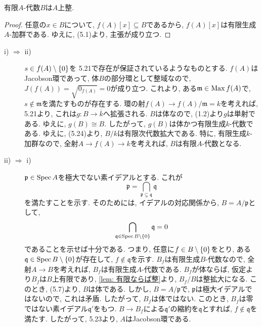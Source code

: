 \documentclass[dvipdfmx]{jsarticle}
\begin{document}
    \begin{lemma} \label{lem: 有限ならば整}
        有限$A$-代数$B$は$A$上整.
    \end{lemma}
    \begin{proof}
        任意の$x \in B$について, $f(A)[x] \subseteq B$であるから, $f(A)[x]$は有限生成$A$-加群である.
        ゆえに, (5.1)より, 主張が成り立つ.
    \end{proof}

    \begin{problem}
        \begin{description}
            \item[i) $\Rightarrow$ ii)]
            $s \in f(A) \setminus \{0\}$を
            5.21で存在が保証されているようなものとする.
            $f(A)$はJacobson環であって, 体$B$の部分環として整域なので,
            $J(f(A)) = \sqrt{0_{f(A)}} = 0$が成り立つ.
            これより, ある$\mathfrak{m} \in \operatorname{Max}{f(A)}$で, $s \notin \mathfrak{m}$を満たすものが存在する.
            環の射$f(A) \to f(A)/\mathfrak{m} = k$を考えれば, 5.21より, これは$g:B \to \overline{k}$へ拡張される.
            $B$は体なので, (1.2)より$g$は単射である.
            ゆえに, $g(B) \cong B$.
            したがって, $g(B)$は体かつ有限生成$k$-代数である.
            ゆえに, (5.24)より, $B/k$は有限次代数拡大である.
            特に, 有限生成$k$-加群なので,
            全射$A \to f(A) \to k$を考えれば, $B$は有限$A$-代数となる.
            \item[ii) $\Rightarrow$ i)]
            $\mathfrak{p} \in \operatorname{Spec}{A}$を極大でない素イデアルとする.
            これが
            \[
                \mathfrak{p} = \bigcap_{\mathfrak{p} \subsetneq \mathfrak{q}} \mathfrak{q}
            \]
            を満たすことを示す.
            そのためには, イデアルの対応関係から, $B = A/\mathfrak{p}$として,
            \[
                \bigcap_{\mathfrak{q} \in \operatorname{Spec}{B}\setminus\{0\}} \mathfrak{q} = 0
            \]
            であることを示せば十分である.
            つまり, 任意に$f \in B \setminus \{0\}$をとり, ある$\mathfrak{q} \in \operatorname{Spec}{B} \setminus \{0\}$が存在して, $f \notin \mathfrak{q}$を示す.
            $B_f$は有限生成$B$-代数なので, 全射$A \to B$を考えれば, $B_f$は有限生成$A$-代数である.
            $B_f$が体ならば, 仮定より$B_f$は$B$上有限であり, \cref{lem: 有限ならば整}より, $B_f/B$は整拡大になる.
            このとき, (5.7)より, $B$は体である.
            しかし, $B = A/\mathfrak{p}$で, $\mathfrak{p}$は極大イデアルではないので,
            これは矛盾.
            したがって, $B_f$は体ではない.
            このとき, $B_f$は零ではない素イデアル$\mathfrak{q}'$をもつ.
            $B \to B_f$による$\mathfrak{q}'$の縮約を$\mathfrak{q}$とすれば, $f \notin \mathfrak{q}$を満たす.
            したがって, 5.23より, $A$はJacobson環である.
        \end{description}
    \end{problem}
\end{document}
